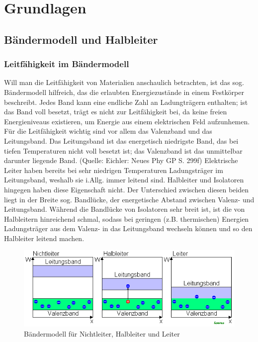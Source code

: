 
\chapter{Grundlagen}
\section{Bändermodell und Halbleiter}
\subsection{Leitfähigkeit im Bändermodell}
Will man die Leitfähigkeit von Materialien anschaulich betrachten, ist das sog. Bändermodell hilfreich, das die erlaubten Energiezustände in einem Festkörper beschreibt. Jedes Band kann eine endliche Zahl an Ladungträgern enthalten; ist das Band voll besetzt, trägt es nicht zur Leitfähigkeit bei, da keine freien Energieniveaus existieren, um Energie aus einem elektrischen Feld aufzunhemen. Für die Leitfähigkeit wichtig sind vor allem das Valenzband und das Leitungsband. Das Leitungsband ist das energetisch niedrigste Band, das bei tiefen Temperaturen nicht voll besetzt ist; das Valenzband ist das unmittelbar darunter liegende Band. (Quelle: Eichler: Neues Phy GP S. 299f)
Elektrische Leiter haben bereits bei sehr niedrigen Temperaturen Ladungsträger im Leitungsband, weshalb sie i.Allg. immer leitend sind. Halbleiter und Isolatoren hingegen haben diese Eigenschaft nicht. Der Unterschied zwischen diesen beiden liegt in der Breite sog. Bandlücke, der energetische Abstand zwischen Valenz- und Leitungsband. Während die Bandlücke von Isolatoren sehr breit ist, ist die von Halbleitern hinreichend schmal, sodass bei geringen (z.B. thermischen) Energien Ladungsträger aus dem Valenz- in das Leitungsband wechseln können und so den Halbleiter leitend machen. \\
\begin{figure}[h]
    \centering
    \includegraphics[scale=0.75]{Bilder/Baendermodell.png}
    \caption{Bändermodell für Nichtleiter, Halbleiter und Leiter \protect \footnotemark}
\end{figure}

